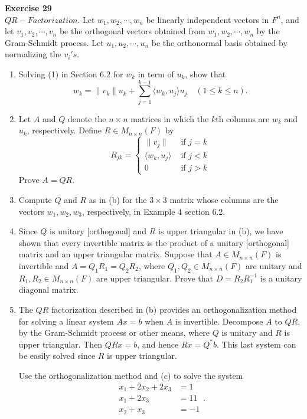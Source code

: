 \documentclass[12pt, a4paper]{article}
\theoremstyle{plain}
\newenvironment{exercise}[2][Exercise]
    { \begin{mdframed}[backgroundcolor=gray!20] \textbf{#1 #2} \\}
    {  \end{mdframed}}
\begin{document}
\begin{exercise}{29}
$QR-Factorization$. Let $w_1,w_2,\cdots,w_n$ be linearly independent vectors in $F^n$, and let $v_1, v_2,\cdots,v_n$ be the orthogonal vectors obtained from $w_1,w_2,\cdots,w_n$ by the Gram-Schmidt process. Let $u_1,u_2,\cdots,u_n$ be the orthonormal basis obtained by normalizing the $v_i's$.
\begin{enumerate}[label=(\alph*)]
\item Solving (1) in Section 6.2 for $w_k$ in term of $u_k$, show that 
\[
w_k = \|v_k\|u_k+\sum_{j=1}^{k-1}{\langle{w_k,u_j}\rangle u_j}\quad (1\leq k\leq n).
\]
\item Let $A$ and $Q$ denote the $n\times n$ matrices in which the $k$th columns are $w_k$ and $u_k$, respectively. Define $R\in M_{n\times n}(F)$ by
\[
R_{jk} = \left\{\begin{array}{cc}
\|v_j\|& \text{ if } j = k\\
\langle{w_k,u_j}\rangle & \text{ if } j<k\\
0 & \text{ if }j>k
\end{array}\right.
\]
Prove $A=QR$.
\item Compute $Q$ and $R$ as in (b) for the $3\times 3$ matrix whose columns are the vectors $w_1,w_2,w_3$, respectively, in Example 4 section 6.2.
\item Since $Q$ is unitary [orthogonal] and $R$ is upper triangular in (b), we have shown that every invertible matrix is the product of a unitary [orthogonal] matrix and an upper triangular matrix. Suppose that $A\in M_{n\times n}(F)$ is invertible and $A=Q_1R_1 = Q_2R_2$, where $Q_1,Q_2\in M_{n\times n}(F)$ are unitary and $R_1,R_2\in M_{n\times n}(F)$ are upper triangular. Prove that $D=R_2R_1^{-1}$ is a unitary diagonal matrix.
\item The $QR$ factorization described in (b) provides an orthogonalization method for solving a linear system $Ax=b$ when $A$ is invertible. Decompose $A$ to $QR$, by the Gram-Schmidt process or other means, where $Q$ is unitary and $R$ is upper triangular. Then $QRx = b$, and hence $Rx = Q^*b$. This last system can be easily solved since $R$ is upper triangular.

Use the orthogonalization method and (c) to solve the system 
\[
\begin{array}{cc}
x_1+2x_2+2x_3 &= 1\\
x_1+2x_3 &= 11\\
x_2+x_3&=-1
\end{array}.
\]
\end{enumerate}
\end{exercise}
\end{document}
